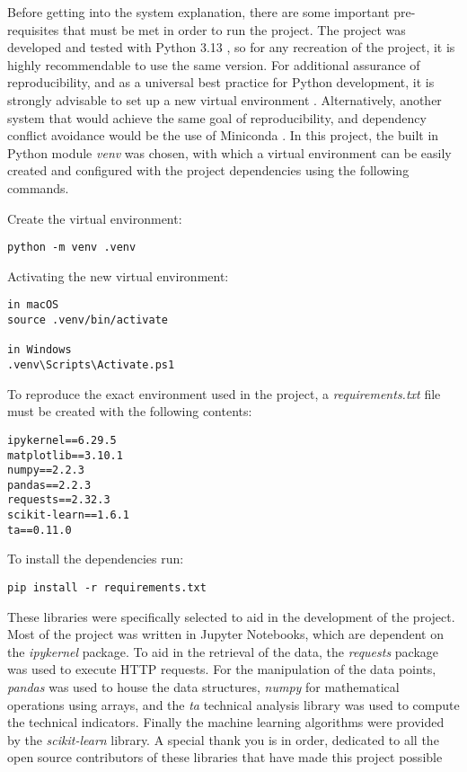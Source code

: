 \documentclass[12pt]{report} %
\begin{document}
Before getting into the system explanation, there are some important pre-requisites that must be met in order to run the project. The project was developed and tested with Python 3.13 \cite{python3.13}, so for any recreation of the project, it is highly recommendable to use the same version. For additional assurance of reproducibility, and as a universal best practice for Python development, it is strongly advisable to set up a new virtual environment \cite{python_venv}. Alternatively, another system that would achieve the same goal of reproducibility, and dependency conflict avoidance would be the use of Miniconda \cite{conda}. In this project, the built in Python module \textit{venv} was chosen, with which a virtual environment can be easily created and configured with the project dependencies using the following commands.

\noindent Create the virtual environment:
\begin{verbatim}
python -m venv .venv
\end{verbatim}

\noindent Activating the new virtual environment:
\begin{verbatim}
in macOS
source .venv/bin/activate

in Windows
.venv\Scripts\Activate.ps1
\end{verbatim}

\noindent To reproduce the exact environment used in the project, a \textit{requirements.txt} file must be created with the following contents:
\begin{verbatim}
ipykernel==6.29.5
matplotlib==3.10.1
numpy==2.2.3
pandas==2.2.3
requests==2.32.3
scikit-learn==1.6.1
ta==0.11.0
\end{verbatim}

\noindent To install the dependencies run:
\begin{verbatim}
pip install -r requirements.txt 
\end{verbatim}

These libraries were specifically selected to aid in the development of the project. Most of the project was written in Jupyter Notebooks, which are dependent on the \textit{ipykernel} package. To aid in the retrieval of the data, the \textit{requests} package was used to execute HTTP requests. For the manipulation of the data points, \textit{pandas} was used to house the data structures, \textit{numpy} for mathematical operations using arrays, and the \textit{ta} technical analysis library was used to compute the technical indicators. Finally the machine learning algorithms were provided by the \textit{scikit-learn} library. A special thank you is in order, dedicated to all the open source contributors of these libraries that have made this project possible
\end{document}

